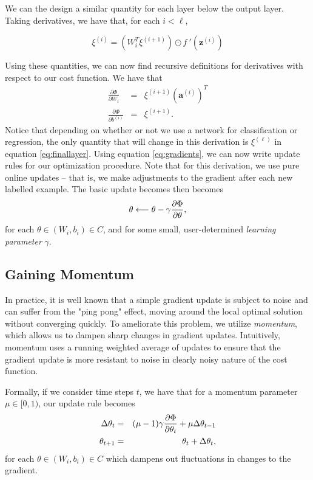 We can the design a similar quantity for each layer below the output layer. Taking derivatives, we have that, for each $i< \ell$,

\begin{equation}
\label{update1}
\xi^{(i)} = (W_i^T\xi^{(i+1)})\odot f\:'(\mathbf{z}^{(i)})
\end{equation}

Using these quantities, we can now find recursive definitions for derivatives with respect to our cost function. We have that 
\begin{eqnarray}
\label{eq:gradients}
\frac{\partial\Phi}{\partial W_i} &=& \xi^{(i+1)}(\mathbf{a}^{(i)})^T\\
\frac{\partial\Phi}{\partial {b}^{(i)}} &=& \xi^{(i+1)}.
\end{eqnarray}
Notice that depending on whether or not we use a network for classification or regression, the only quantity that will change in this derivation is $\xi^{(\ell)}$ in equation \eqref{eq:finallayer}. Using equation \eqref{eq:gradients}, we can now write update rules for our optimization procedure. Note that for this derivation, we use pure online updates -- that is, we make adjustments to the gradient after each new labelled example. The basic update becomes then becomes
\begin{equation}
\theta \longleftarrow \theta - \gamma \frac{\partial \Phi}{\partial \theta},
\end{equation}
for each $\theta\in(W_i, {b}_i)\in C$, and for some small, user-determined \emph{learning parameter} $\gamma$.

\subsection{Gaining Momentum}

In practice, it is well known that a simple gradient update is subject to noise and can suffer from the "ping pong" effect, moving around the local optimal solution without converging quickly. To ameliorate this problem, we utilize \emph{momentum}, which allows us to dampen sharp changes in gradient 
updates. Intuitively, momentum uses a running weighted average of updates to ensure that the gradient update is more resistant to noise in clearly noisy nature of the cost function. 

Formally, if we consider time steps $t$, we have that for a momentum parameter $\mu\in[0,1)$, our update rule becomes 
\begin{eqnarray}
\label{eq:updaterule}
\Delta\theta_{t} &=& (\mu - 1)\gamma\frac{\partial \Phi}{\partial \theta_t} + \mu\Delta\theta_{t - 1}\\
\theta_{t+1} &=& \theta_t + \Delta\theta_{t},
\end{eqnarray}
for each $\theta\in(W_i, {b}_i)\in C$ which dampens out fluctuations in changes to the gradient.



